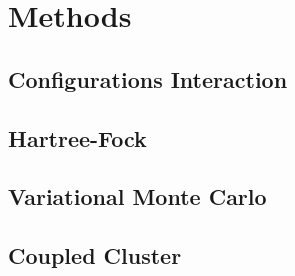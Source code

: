 \section{Methods} \label{sec:methods}
\subsection{Configurations Interaction} \label{subsec:ci}
\subsection{Hartree-Fock} \label{subsec:hf}
\subsection{Variational Monte Carlo} \label{subsec:vmc}
\subsection{Coupled Cluster} \label{subsec:cc}